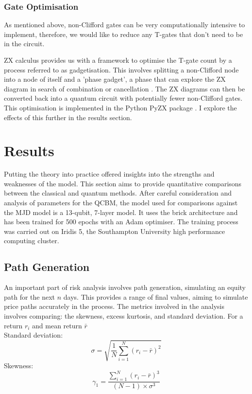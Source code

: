 \documentclass[12pt]{article}
\newcommand{\newp}
    {
    \vskip 0.5cm 
  }
\numberwithin{equation}{section}
\begin{document}
\subsubsection{Gate Optimisation}
As mentioned above, non-Clifford gates can be very computationally intensive to 
implement, therefore, we would like to reduce any T-gates that don't need to be 
in the circuit. 
\newp 
ZX calculus provides us with a framework to optimise the T-gate count by a process
referred to as gadgetisation. This involves splitting a non-Clifford node into a 
node of itself and a 'phase gadget', a phase that can explore the ZX diagram in 
search of combination or cancellation \autocite{phase,globalphase}. The ZX diagrams can then be converted back 
into a quantum circuit with potentially fewer non-Clifford gates. This optimisation 
is implemented in the Python PyZX package \autocite{a2018_pyzx}. I explore the effects of this 
further in the results section.
\newpage
\section{Results}
Putting the theory into practice offered insights into the strengths and weaknesses 
of the model. This section aims to provide quantitative comparisons between the 
classical and quantum methods. After careful consideration and analysis of parameters 
for the QCBM, the model used for comparisons against the MJD model is a 13-qubit,
7-layer model. It uses the brick architecture and has been trained for 500 epochs 
with an Adam optimiser. The training process was carried out on Iridis 5, the 
Southampton University high performance computing cluster\autocite{iridis5}.
\subsection{Path Generation}
An important part of risk analysis involves path generation, simulating an equity 
path for the next $n$ days. This provides a range of final values, aiming to 
simulate price paths accurately in the process. The metrics involved in the analysis 
involves comparing: the skewness, excess kurtosis, and standard deviation. 
For a return $r_i$ and mean return $\bar{r}$ 
\\Standard deviation:
$$
\sigma = \sqrt{\frac{1}{N} \sum_{i=1}^{N} (r_i - \bar{r})^2}
$$
Skewness:
$$
\gamma_1 = \frac{\sum_{i=1}^{N} (r_i - \bar{r})^3}{(N-1) \times \sigma^3}
$$
\end{document}
